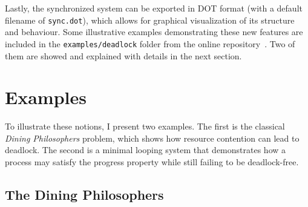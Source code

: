 


Lastly, the synchronized system can be exported in DOT format
(with a default filename of \verb|sync.dot|), which allows for graphical 
visualization of its structure and behaviour. Some illustrative examples 
demonstrating these new features are included in the
\verb|examples/deadlock| folder from the online repository~\cite{rescurepo}.
Two of them are showed and explained with details in the next section.


\section{Examples}

To illustrate these notions, I present two examples. The first is the
classical \emph{Dining Philosophers} problem, which shows how resource
contention can lead to deadlock. The second is a minimal looping system
that demonstrates how a process may satisfy the progress property while
still failing to be deadlock-free.

\subsection{The Dining Philosophers}


